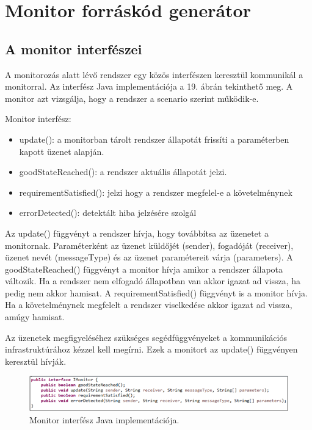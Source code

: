 \chapter{Monitor forráskód generátor}

\section{A monitor interfészei}

A monitorozás alatt lévő rendszer egy közös interfészen keresztül kommunikál a monitorral. Az interfész Java implementációja a 19. ábrán tekinthető meg. A monitor azt vizsgálja, hogy a rendszer a scenario szerint működik-e.

Monitor interfész:
\begin{itemize}
    \item update(): a monitorban tárolt rendszer állapotát frissíti a paraméterben kapott üzenet alapján.
    \item goodStateReached(): a rendszer aktuális állapotát jelzi.
    \item requirementSatisfied(): jelzi hogy a rendszer megfelel-e a követelménynek
    \item errorDetected(): detektált hiba jelzésére szolgál
\end{itemize}

Az update() függvényt a rendszer hívja, hogy továbbítsa az üzenetet a monitornak. Paraméterként az üzenet küldőjét (sender), fogadóját (receiver), üzenet nevét (messageType) és az üzenet paramétereit várja (parameters). A goodStateReached() függvényt a monitor hívja amikor a rendszer állapota változik. Ha a rendszer nem elfogadó állapotban van akkor igazat ad vissza, ha pedig nem akkor hamisat. A requirementSatisfied() függvényt is a monitor hívja. Ha a követelménynek megfelelt a rendszer viselkedése akkor igazat ad vissza, amúgy hamisat.

Az üzenetek megfigyeléséhez szükséges segédfüggvényeket a kommunikációs infrastruktúrához kézzel kell megírni. Ezek a monitort az update() függvényen keresztül hívják.

\begin{figure}[!ht]
    \centering
    \includegraphics[width=150mm, keepaspectratio]{figures/17abra.png}
    \caption{Monitor interfész Java implementációja.}
\end{figure}

